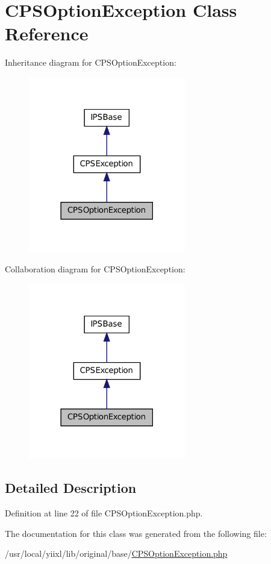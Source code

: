 \hypertarget{classCPSOptionException}{
\section{CPSOptionException Class Reference}
\label{classCPSOptionException}
}


Inheritance diagram for CPSOptionException:\nopagebreak
\begin{figure}[H]
\begin{center}
\leavevmode
\includegraphics[width=194pt]{classCPSOptionException__inherit__graph}
\end{center}
\end{figure}


Collaboration diagram for CPSOptionException:\nopagebreak
\begin{figure}[H]
\begin{center}
\leavevmode
\includegraphics[width=194pt]{classCPSOptionException__coll__graph}
\end{center}
\end{figure}


\subsection{Detailed Description}


Definition at line 22 of file CPSOptionException.php.



The documentation for this class was generated from the following file:\begin{DoxyCompactItemize}
\item 
/usr/local/yiixl/lib/original/base/\hyperlink{CPSOptionException_8php}{CPSOptionException.php}\end{DoxyCompactItemize}

